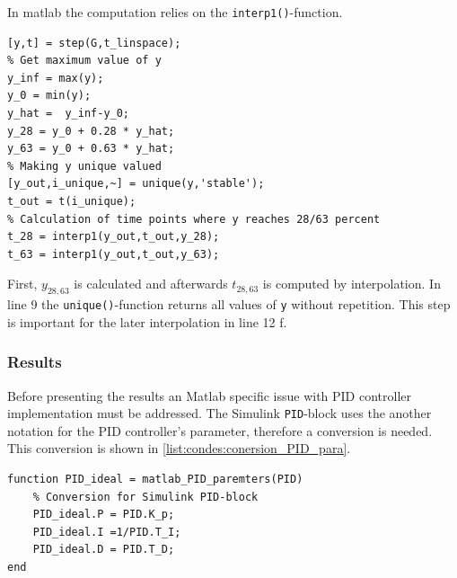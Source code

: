In matlab the computation relies on the \texttt{interp1()}-function.

\begin{lstlisting}[style=Matlab-editor,caption={This code snippet shows the general way of calculating $t_{28}$ and $t_{63}$.},captionpos=b,label={list:condes:maxS}]
[y,t] = step(G,t_linspace);
% Get maximum value of y
y_inf = max(y);
y_0 = min(y);
y_hat =  y_inf-y_0;
y_28 = y_0 + 0.28 * y_hat;
y_63 = y_0 + 0.63 * y_hat;
% Making y unique valued
[y_out,i_unique,~] = unique(y,'stable');
t_out = t(i_unique);
% Calculation of time points where y reaches 28/63 percent
t_28 = interp1(y_out,t_out,y_28);
t_63 = interp1(y_out,t_out,y_63);
\end{lstlisting}

First, $y_{28,63}$ is calculated and afterwards $t_{28,63}$ is computed by interpolation.
In line 9 the \texttt{unique()}-function returns all values of \texttt{y} without repetition.
This step is important for the later interpolation in line 12 f.


\subsubsection{Results} \label{sec:condes:ZN:results}

Before presenting the results an Matlab specific issue with PID controller implementation must be addressed.
The Simulink \texttt{PID}-block uses the another notation for the PID controller's parameter, therefore a conversion is needed. 
This conversion is shown in \autoref{list:condes:conersion_PID_para}.

\begin{lstlisting}[style=Matlab-editor,caption={Conversion of the parameters calculated by the previously mentioned algorithms and the values required for Simulink PID block in Matlab.},captionpos=b,label={list:condes:conersion_PID_para}]
function PID_ideal = matlab_PID_paremters(PID)
    % Conversion for Simulink PID-block
    PID_ideal.P = PID.K_p;
    PID_ideal.I =1/PID.T_I;
    PID_ideal.D = PID.T_D;
end
\end{lstlisting}


